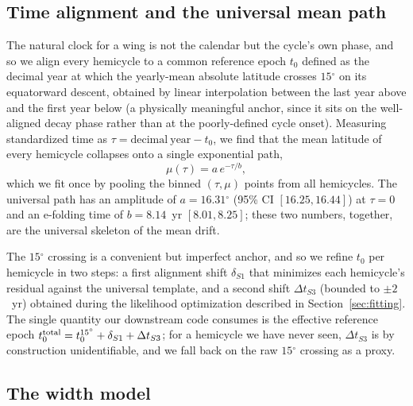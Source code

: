 \documentclass[twocolumn]{aastex631}
\newcommand{\degr}{\ensuremath{^{\circ}}}
\newcommand{\tzero}{\ensuremath{t_0}}
\begin{document}
\subsection{Time alignment and the universal mean path}
\label{sec:meanpath}

The natural clock for a wing is not the calendar but the cycle's own phase, and
so we align every hemicycle to a common reference epoch \tzero{} defined as the
decimal year at which the yearly-mean absolute latitude crosses $15\degr$ on its
equatorward descent, obtained by linear interpolation between the last year above
and the first year below (a physically meaningful anchor, since it sits on the
well-aligned decay phase rather than at the poorly-defined cycle onset).
Measuring standardized time as $\tau =
\mathrm{decimal\ year} - \tzero$, we find that the mean latitude of every
hemicycle collapses onto a single exponential path,
%
\begin{equation}
  \mu(\tau) = a\,e^{-\tau/b},
  \label{eq:meanpath}
\end{equation}
%
which we fit once by pooling the binned $(\tau,\mu)$ points from all hemicycles.
The universal path has an amplitude of $a = 16.31\degr$ (95\% CI
$[16.25, 16.44]$) at $\tau=0$ and an e-folding time of $b = 8.14$~yr
$[8.01, 8.25]$; these two numbers, together, are the universal skeleton of the
mean drift.

The $15\degr$ crossing is a convenient but imperfect anchor, and so we refine
\tzero{} per hemicycle in two steps: a first alignment shift $\delta_{S1}$ that
minimizes each hemicycle's residual against the universal template, and a second
shift $\Delta t_{S3}$ (bounded to $\pm2$~yr) obtained during the likelihood
optimization described in Section~\ref{sec:fitting}. The single quantity our
downstream code consumes is the effective reference epoch $t_0^{\rm total} =
t_0^{15\degr} + \delta_{S1} + \Delta t_{S3}$; for a hemicycle we have never seen,
$\Delta t_{S3}$ is by construction unidentifiable, and we fall back on the raw
$15\degr$ crossing as a proxy.

\subsection{The width model}
\label{sec:width}
\end{document}
